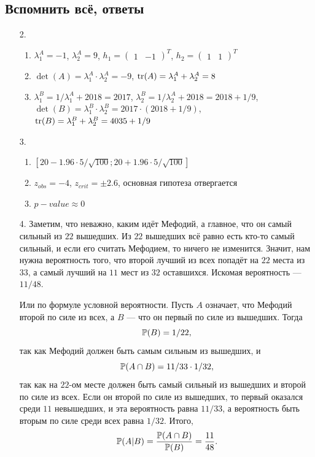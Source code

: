 \subsection{Вспомнить всё, ответы}

\begin{enumerate}
\item[2.]
\begin{enumerate}
  \item $\lambda^A_1 = -1$, $\lambda^A_2 = 9$,
  $h_1 = \begin{pmatrix}
  1 & -1
  \end{pmatrix}^T$,
  $h_2 = \begin{pmatrix}
  1 & 1
  \end{pmatrix}^T$
  \item $\det(A) = \lambda^A_1 \cdot \lambda^A_2 = -9$, $\tr(A) = \lambda^A_1 +
  \lambda^A_2 = 8$
  \item $\lambda^B_1 = 1 / \lambda^A_1 + 2018 = 2017$,
  $\lambda^B_2 = 1 / \lambda^A_2 + 2018 = 2018 + 1/9$,
  $\det(B) = \lambda^B_1 \cdot \lambda^B_2 = 2017 \cdot (2018 + 1/9)$,
  $\tr(B) = \lambda^B_1 + \lambda^B_2 = 4035 + 1/9$
\end{enumerate}
\item[3.]
\begin{enumerate}
\item $\left[20 - 1.96 \cdot 5 / \sqrt{100}; 20 + 1.96 \cdot 5 / \sqrt{100} \right]$
\item $z_{obs} = -4$, $z_{crit} = \pm 2.6$, основная гипотеза отвергается
\item $p-value \approx 0 $
\end{enumerate}
\item[4.] Заметим, что неважно, каким идёт Мефодий, а главное, что он самый сильный из
$22$ вышедших. Из $22$ вышедших всё равно есть кто-то самый сильный, и если его
считать Мефодием, то ничего не изменится. Значит, нам нужна вероятность того,
что второй лучший из всех попадёт на $22$ места из $33$, а самый лучший на $11$
мест из $32$ оставшихся. Искомая вероятность — $11/48$.

Или по формуле условной вероятности. Пусть $A$ означает, что Мефодий второй по силе
из всех, а $B$ — что он первый по силе из вышедших. Тогда
\[
\P(B) = 1/22,
\]
так как Мефодий должен быть самым сильным из вышедших, и
\[
\P(A \cap B) = 11/33 \cdot 1/32,
\]
так как на $22$-ом месте должен быть самый сильный из вышедших и второй по силе из
всех. Если он второй по силе из вышедших, то первый оказался среди $11$ невышедших,
и эта вероятность равна $11/33$, а вероятность быть вторым по силе среди всех равна
$1/32$. Итого,
\[
\P(A|B) = \frac{\P(A \cap B)}{\P(B)} = \frac{11}{48}.
\]
\end{enumerate}




